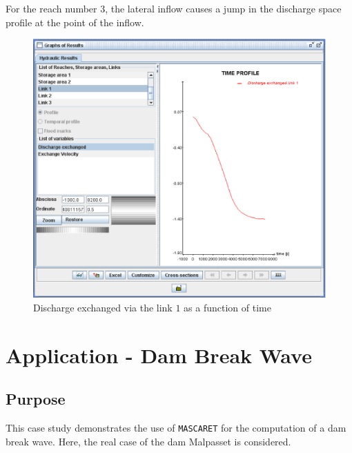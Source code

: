 \documentclass[a4paper,12pt]{article}
\begin{document}
\vspace{0.5cm}

For the reach number $3$, the lateral inflow causes a jump in the discharge
space profile at the point of the inflow. 

\newpage

\begin{figure}[h]
  \begin{center}
  \includegraphics[scale=0.5]{discharge_link1}
  \caption{Discharge exchanged via the link $1$ as a function of time}
  \label{fig:Discharge-link1}
  \end{center}
\end{figure}




\section{Application - Dam Break Wave }


\subsection{Purpose   }

\hspace{0.5cm}This case study demonstrates the use of \texttt{MASCARET} for the computation
of a dam break wave. Here, the real case of the dam Malpasset is considered.
\end{document}
